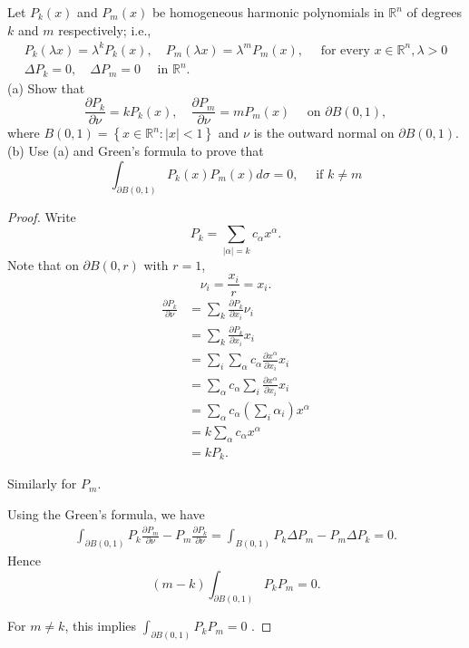 \begin{problem}
	Let $P_k(x)$ and $P_m(x)$ be homogeneous harmonic polynomials in $\mathbb{R}^n$ of degrees $k$ and $m$ respectively; i.e.,
\[
\begin{gathered}
P_k(\lambda x)=\lambda^k P_k(x), \quad P_m(\lambda x)=\lambda^m P_m(x), \quad \text { for every } x \in \mathbb{R}^n, \lambda>0 \\
\Delta P_k=0, \quad \Delta P_m=0 \quad \text { in } \mathbb{R}^n .
\end{gathered}
\]
(a) Show that
\[
\frac{\partial P_k}{\partial \nu}=k P_k(x), \quad \frac{\partial P_m}{\partial \nu}=m P_m(x) \quad \text { on } \partial B(0,1),
\]
where $B(0,1)=\left\{x \in \mathbb{R}^n:|x|<1\right\}$ and $\nu$ is the outward normal on $\partial B(0,1)$.
(b) Use (a) and Green's formula to prove that
\[
\int_{\partial B(0,1)} P_k(x) P_m(x) d \sigma=0, \quad \text { if } k \neq m
\]
\end{problem}
\begin{proof}
	Write \[
		P_k = \sum_{|\alpha| = k} c_\alpha x^\alpha
	.\] 
	Note that on $\partial B(0,r)$ with $r = 1$,
	\[
		\nu_i = \frac{x_i}{r} = x_i
	.\] 
	\begin{align*}
		\frac{\partial P_k}{\partial \nu} 
		&= \sum_k \frac{\partial P_k}{\partial x_i} \nu_i \\
		&= \sum_k \frac{\partial P_k}{\partial x_i} x_i \\
		&= \sum_i \sum_\alpha c_\alpha \frac{\partial x^\alpha}{\partial x_i}  x_i \\
		&= \sum_\alpha c_\alpha \sum_i \frac{\partial x^\alpha}{\partial x_i} x_i \\
		&= \sum_\alpha c_\alpha \left( \sum_i \alpha_i \right)  x^\alpha \\
		&= k \sum_\alpha c_\alpha x^\alpha \\
		&= k P_k
	.\end{align*}


	Similarly for $P_m$.

	Using the Green's formula, we have
	\begin{align*}
		\int _{\partial B(0,1)} P_k \frac{\partial P_m}{\partial \nu} - P_m \frac{\partial P_k}{\partial \nu} 
		= \int _{B(0,1)} P_k \Delta P_m - P_m \Delta P_k = 0
	.\end{align*}
	Hence
	\[
		(m - k) \int _{\partial B(0,1)} P_k P_m = 0
	.\] 

	For $m \neq k$, this implies $\int _{\partial B(0,1)} P_k P_m=0$ .

\end{proof}



